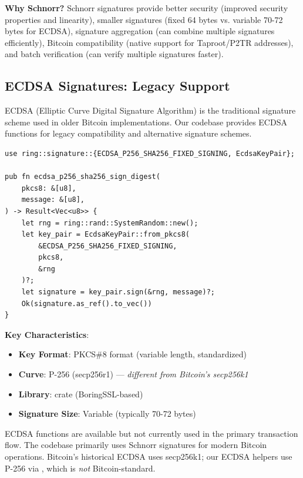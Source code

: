 \textbf{Why Schnorr?} Schnorr signatures provide better security (improved security properties and linearity), smaller signatures (fixed 64 bytes vs. variable 70-72 bytes for ECDSA), signature aggregation (can combine multiple signatures efficiently), Bitcoin compatibility (native support for Taproot/P2TR addresses), and batch verification (can verify multiple signatures faster).

\subsection{ECDSA Signatures: Legacy Support}
\label{sec:ch08-ecdsa}

ECDSA (Elliptic Curve Digital Signature Algorithm) is the traditional signature scheme used in older Bitcoin implementations. Our codebase provides ECDSA functions for legacy compatibility and alternative signature schemes.

\begin{listing}[htbp]
\caption{ECDSA P-256 signature signing ()}
\label{lst:ch08-ecdsa-sign}
\begin{verbatim}
use ring::signature::{ECDSA_P256_SHA256_FIXED_SIGNING, EcdsaKeyPair};

pub fn ecdsa_p256_sha256_sign_digest(
    pkcs8: &[u8],
    message: &[u8],
) -> Result<Vec<u8>> {
    let rng = ring::rand::SystemRandom::new();
    let key_pair = EcdsaKeyPair::from_pkcs8(
        &ECDSA_P256_SHA256_FIXED_SIGNING,
        pkcs8,
        &rng
    )?;
    let signature = key_pair.sign(&rng, message)?;
    Ok(signature.as_ref().to_vec())
}
\end{verbatim}
\end{listing}

\textbf{Key Characteristics}:
\begin{itemize}
  \item \textbf{Key Format}: PKCS\#8 format (variable length, standardized)
  \item \textbf{Curve}: P-256 (secp256r1) --- \emph{different from Bitcoin's secp256k1}
  \item \textbf{Library}:  crate (BoringSSL-based)
  \item \textbf{Signature Size}: Variable (typically 70-72 bytes)
\end{itemize}

\begin{warnbox}
ECDSA functions are available but not currently used in the primary transaction flow. The codebase primarily uses Schnorr signatures for modern Bitcoin operations. Bitcoin's historical ECDSA uses secp256k1; our ECDSA helpers use P-256 via , which is \emph{not} Bitcoin-standard.
\end{warnbox}

